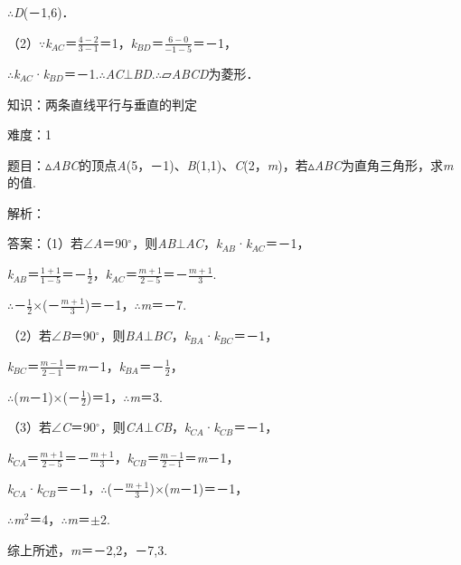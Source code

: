 \documentclass{article} %
\begin{document}
$\mathrm{\therefore}$\textit{D}(－1,6)．

（2）$\mathrm{\because}$\textit{k${}_{AC}$}＝$\frac{4-2}{3-1}$＝1，\textit{k${}_{BD}$}＝$\frac{6-0}{-1-5}$＝－1，

$\mathrm{\therefore}$\textit{k${}_{AC}$}·\textit{k${}_{BD}$}＝－1.$\mathrm{\therefore}$\textit{AC}$\mathrm{\bot}$\textit{BD}.$\mathrm{\therefore}$▱\textit{ABCD}为菱形．



知识：两条直线平行与垂直的判定

难度：1

题目：$\mathrm{\vartriangle}$\textit{ABC}的顶点\textit{A}(5，－1)、\textit{B}(1,1)、\textit{C}(2，\textit{m})，若$\mathrm{\vartriangle}$\textit{ABC}为直角三角形，求\textit{m}的值.

解析：

答案：（1）若$\mathrm{\angle}$\textit{A}＝90$\mathrm{{}^\circ}$，则\textit{AB}$\mathrm{\bot}$\textit{AC}，\textit{k${}_{AB}$}·\textit{k${}_{AC}$}＝－1，

\textit{k${}_{AB}$}＝$\frac{1+1}{1-5}$＝－$\frac{1}{2}$，\textit{k${}_{AC}$}＝$\frac{m+1}{2-5}$＝－$\frac{m+1}{3}$.

$\mathrm{\therefore}$－$\frac{1}{2}\mathrm{\times}$(－$\frac{m+1}{3}$)＝－1，$\mathrm{\therefore}$\textit{m}＝－7.



（2）若$\mathrm{\angle}$\textit{B}＝90$\mathrm{{}^\circ}$，则\textit{BA}$\mathrm{\bot}$\textit{BC}，\textit{k${}_{BA}$}·\textit{k${}_{BC}$}＝－1，

\textit{k${}_{BC}$}＝$\frac{m-1}{2-1}$＝\textit{m}－1，\textit{k${}_{BA}$}＝－$\frac{1}{2}$，

$\mathrm{\therefore}$(\textit{m}－1)$\mathrm{\times}$(－$\frac{1}{2}$)＝1，$\mathrm{\therefore}$\textit{m}＝3.

（3）若$\mathrm{\angle}$\textit{C}＝90$\mathrm{{}^\circ}$，则\textit{CA}$\mathrm{\bot}$\textit{CB}，\textit{k${}_{CA}$}·\textit{k${}_{CB}$}＝－1，

\textit{k${}_{CA}$}＝$\frac{m+1}{2-5}$＝－$\frac{m+1}{3}$，\textit{k${}_{CB}$}＝$\frac{m-1}{2-1}$＝\textit{m}－1，

\textit{k${}_{CA}$}·\textit{k${}_{CB}$}＝－1，$\mathrm{\therefore}$(－$\frac{m+1}{3}$)$\mathrm{\times}$(\textit{m}－1)＝－1，

$\mathrm{\therefore}$\textit{m}${}^{2}$＝4，$\mathrm{\therefore}$\textit{m}＝$\mathrm{\pm}$2.

综上所述，\textit{m}＝－2,2，－7,3.
\end{document}
